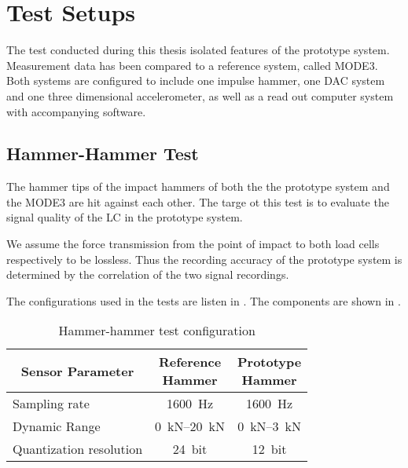 \chapter{Test Setups}
\label{chap:\currfilebase}

The test conducted during this thesis isolated features of the prototype system. Measurement data has been compared to a reference system, called MODE3. Both systems are configured to include one impulse hammer, one \ac{DAC} system and one three dimensional accelerometer, as well as a read out computer system with accompanying software.

\section{Hammer-Hammer Test}

The hammer tips of the impact hammers of both the the prototype system and the MODE3 are hit against each other. The targe ot this test is to evaluate the signal quality of the \ac{LC} in the prototype system.

We assume the force transmission from the point of impact to both load cells respectively to be lossless. Thus the recording accuracy of the prototype system is determined by the correlation of the two signal recordings.

The configurations used in the tests are listen in . The components are shown in .

\begin{table}
    \centering
    {\renewcommand{\arraystretch}{1}%
    \footnotesize
    \begin{tabular}{lcc}
        \toprule
        \multicolumn{1}{c}{Sensor Parameter} & \makecell{Reference\\Hammer} & \makecell{Prototype\\Hammer}\\
        \midrule
        Sampling rate & \SI{1600}{\hertz} & \SI{1600}{\hertz}\\
        Dynamic Range & \SIrange{0}{20}{\kilo\newton} & \SIrange{0}{3}{\kilo\newton}\\
        Quantization resolution & \SI{24}{bit} & \SI{12}{bit}\\
        \bottomrule
    \end{tabular}
    \caption[Hammer-Hammer Test Configuration]{Hammer-hammer test configuration}
    \label{tab:hh_config}
    \normalsize
    }
\end{table}

